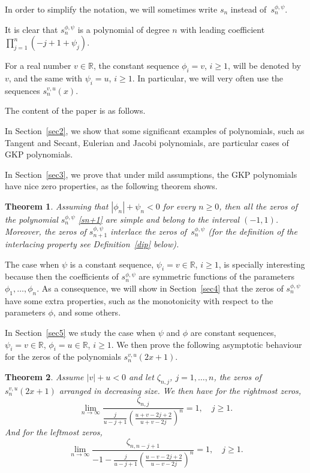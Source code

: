 \documentclass[10pt, a4paper, leqno]{amsart}
\numberwithin{equation}{section}
\theoremstyle{plain}
\newtheorem{Theo}{Theorem}[section]
\theoremstyle{remark}
\newcommand{\RR}{\mathbb{R}}
\newcommand{\spp}{s^{\phi,\psi}}
\newcommand{\scvu}{s^{v,u}}
\begin{document}
In order to simplify the notation, we will sometimes write $s_n$ instead of~$\spp_n$.

It is clear that $\spp_n$ is a polynomial of degree $n$ with leading coefficient $\prod_{j=1}^n(-j+1+\psi_{j})$.

For a real number $v\in \RR$, the constant sequence $\phi_i=v$, $i\ge 1$, will be denoted by $v$, and the same with $\psi_i=u$, $i\ge 1$. In particular, we will very often use the sequences $\scvu_{n}(x)$.

The content of the paper is as follows.

In Section~\ref{sec2}, we show that some significant examples of polynomials, such as Tangent and Secant, Eulerian and Jacobi polynomials, are particular cases of GKP polynomials.

In Section~\ref{sec3}, we prove that under mild assumptions, the GKP polynomials have nice zero properties, as the following theorem shows.

\begin{Theo}
\label{ptci}
Assuming that $|\phi_n| + \psi_n < 0$ for every $n \ge 0$, then all the zeros of the polynomial $\spp_n$ \eqref{sn+1} are simple and belong to the interval $(-1,1)$. Moreover, the zeros of $s_{n+1}^{\phi,\psi}$ interlace the zeros of~$\spp_n$ (for the definition of the interlacing property see Definition~\ref{dip} below).
\end{Theo}

The case when $\psi$ is a constant sequence, $\psi_i=v\in \RR$, $i\ge 1$, is specially interesting because then the coefficients of $\spp_n$ are symmetric functions of the parameters $\phi_1,\dots,\phi_n$. As a consequence, we will show in Section~\ref{sec4} that the zeros of $\spp_n$ have some extra properties, such as the monotonicity with respect to the parameters $\phi$, and some others.

In Section~\ref{sec5} we study the case when $\psi$ and $\phi$ are constant sequences, $\psi_i=v\in \RR$, $\phi_i=u\in \RR$, $i\ge 1$. We then prove the following asymptotic behaviour for the zeros of the polynomials $\scvu_n(2x+1)$.

\begin{Theo}
\label{thchi} 
Assume $|v|+u<0$ and let $\zeta_{n,j}$, $j=1,\dots, n$, the zeros of $s_n^{v,u}(2x+1)$ arranged in decreasing size. We then have for the rightmost zeros,
\begin{equation}
\label{rmzi}
  \lim_{n\to \infty} \frac{\zeta_{n,j}}{\frac{j}{u-j+1}\left(\frac{u+v-2j+2}{u+v-2j}\right)^n} = 1,
  \quad j\ge 1.
\end{equation}
And for the leftmost zeros,
\begin{equation}
\label{lmzi}
  \lim_{n\to \infty} \frac{\zeta_{n,n-j+1}}{-1-\frac{j}{u-j+1}
  \left(\frac{u-v-2j+2}{u-v-2j}\right)^n} = 1,
  \quad j\ge 1.
\end{equation}
\end{Theo}
\end{document}
